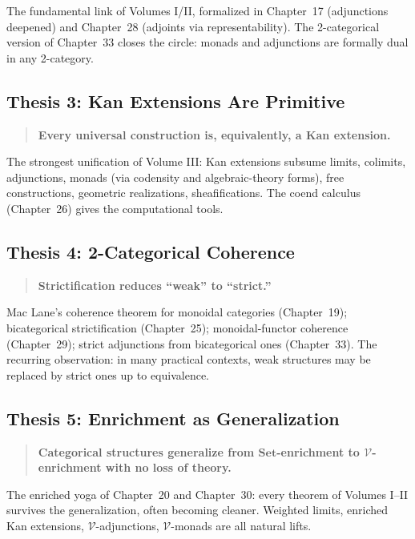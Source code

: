 \noindent The fundamental link of Volumes I/II, formalized in Chapter~17
(adjunctions deepened) and Chapter~28 (adjoints via representability). The
2-categorical version of Chapter~33 closes the circle: monads and
adjunctions are formally dual in any 2-category.

\subsection{Thesis 3: Kan Extensions Are Primitive}

\begin{quote}
\textbf{Every universal construction is, equivalently, a Kan extension.}
\end{quote}

\noindent The strongest unification of Volume III: Kan extensions subsume
limits, colimits, adjunctions, monads (via codensity and algebraic-theory
forms), free constructions, geometric realizations, sheafifications. The
coend calculus (Chapter~26) gives the computational tools.

\subsection{Thesis 4: 2-Categorical Coherence}

\begin{quote}
\textbf{Strictification reduces ``weak'' to ``strict.''}
\end{quote}

\noindent Mac Lane's coherence theorem for monoidal categories (Chapter~19);
bicategorical strictification (Chapter~25); monoidal-functor coherence
(Chapter~29); strict adjunctions from bicategorical ones (Chapter~33). The
recurring observation: in many practical contexts, weak structures may be
replaced by strict ones up to equivalence.

\subsection{Thesis 5: Enrichment as Generalization}

\begin{quote}
\textbf{Categorical structures generalize from $\mathbf{Set}$-enrichment to
$\mathcal{V}$-enrichment with no loss of theory.}
\end{quote}

\noindent The enriched yoga of Chapter~20 and Chapter~30: every theorem of
Volumes I--II survives the generalization, often becoming cleaner. Weighted
limits, enriched Kan extensions, $\mathcal{V}$-adjunctions, $\mathcal{V}$-monads
are all natural lifts.

